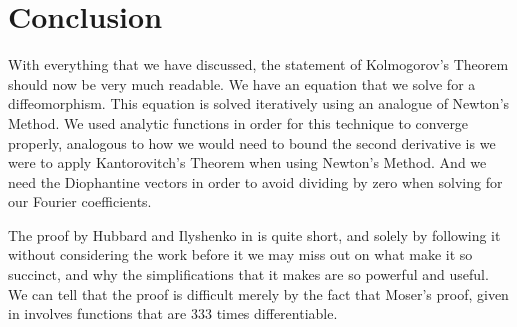 \documentclass[twoside,letterpaper,10pt]{article}
\numberwithin{equation}{section}
\begin{document}
\section{Conclusion}
\label{sec:conclusion}

With everything that we have discussed, the statement of Kolmogorov's Theorem
should now be very much readable.
We have an equation that we solve for a diffeomorphism.
This equation is solved iteratively using an analogue of Newton's Method.
We used analytic functions in order for this technique to converge properly,
analogous to how we would need to bound the second derivative is we were to
apply Kantorovitch's Theorem when using Newton's Method.
And we need the Diophantine vectors in order to avoid dividing by zero when
solving for our Fourier coefficients.

The proof by Hubbard and Ilyshenko in \cite{hi02} is quite short, and solely by
following it without considering the work before it we may miss out on what make
it so succinct, and why the simplifications that it makes are so powerful and
useful.
We can tell that the proof is difficult merely by the fact that Moser's proof,
given in %
involves functions that are $333$ times differentiable.

\nocite{*}


\end{document}
